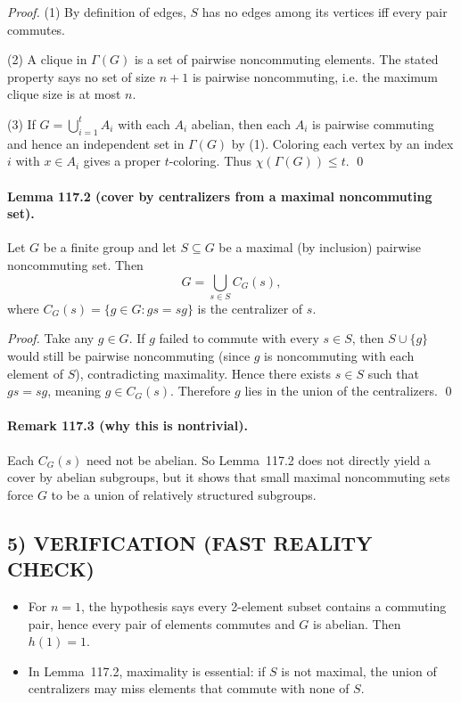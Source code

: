 \emph{Proof.}
(1) By definition of edges, $S$ has no edges among its vertices iff every pair commutes.

(2) A clique in $\Gamma(G)$ is a set of pairwise noncommuting elements.  The stated property says no set of size $n+1$ is pairwise noncommuting, i.e. the maximum clique size is at most $n$.

(3) If $G=\bigcup_{i=1}^t A_i$ with each $A_i$ abelian, then each $A_i$ is pairwise commuting and hence an independent set in $\Gamma(G)$ by (1).  Coloring each vertex by an index $i$ with $x\in A_i$ gives a proper $t$-coloring.  Thus $\chi(\Gamma(G))\le t$. \qed

\paragraph{Lemma 117.2 (cover by centralizers from a maximal noncommuting set).}
Let $G$ be a finite group and let $S\subseteq G$ be a maximal (by inclusion) pairwise noncommuting set.  Then
\[
G=\bigcup_{s\in S} C_G(s),
\]
where $C_G(s)=\{g\in G: gs=sg\}$ is the centralizer of $s$.

\emph{Proof.}
Take any $g\in G$.  If $g$ failed to commute with every $s\in S$, then $S\cup\{g\}$ would still be pairwise noncommuting (since $g$ is noncommuting with each element of $S$), contradicting maximality.  Hence there exists $s\in S$ such that $gs=sg$, meaning $g\in C_G(s)$.  Therefore $g$ lies in the union of the centralizers. \qed

\paragraph{Remark 117.3 (why this is nontrivial).}
Each $C_G(s)$ need not be abelian.  So Lemma~117.2 does not directly yield a cover by abelian subgroups, but it shows that small maximal noncommuting sets force $G$ to be a union of relatively structured subgroups.

\subsection*{5) VERIFICATION (FAST REALITY CHECK)}
\begin{itemize}
\item For $n=1$, the hypothesis says every 2-element subset contains a commuting pair, hence every pair of elements commutes and $G$ is abelian.  Then $h(1)=1$.
\item In Lemma~117.2, maximality is essential: if $S$ is not maximal, the union of centralizers may miss elements that commute with none of $S$.
\end{itemize}

